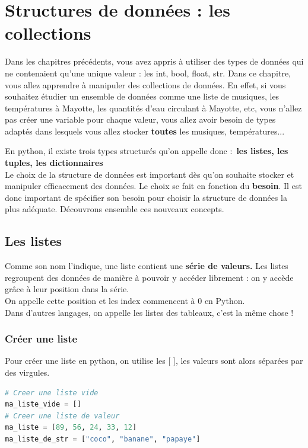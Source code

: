 \renewcommand{\chaptername}{\phantom{Chapitre}}\renewcommand{\thechapter}{}
\chapter{Structures de données : les collections}
\vspace{-1cm}
Dans les chapitres précédents, vous avez appris à utiliser des types de données qui ne contenaient qu'une unique valeur : les int, bool, float, str. 
Dans ce chapitre, vous allez apprendre à manipuler des collections de données. En effet, si vous souhaitez étudier un ensemble de données comme une liste de musiques, les températures à Mayotte, les quantités d'eau circulant à Mayotte, etc, vous n'allez pas créer une variable pour chaque valeur, vous allez avoir besoin de types adaptés dans lesquels vous allez stocker \textbf{toutes} les musiques, températures...\

En python, il existe trois types structurés qu'on appelle donc  :~\textbf{les listes, les tuples, les dictionnaires}\\

Le choix de la structure de données est important dès qu'on souhaite stocker et manipuler efficacement des données. Le choix se fait en fonction du \textbf{besoin}. Il est donc important de spécifier son besoin pour choisir la structure de données la plus adéquate. Découvrons ensemble ces nouveaux concepts.

\section{Les listes}

\begin{Definition}
Comme son nom l'indique, une liste contient une \textbf{série de valeurs.} Les listes regroupent des données de manière à pouvoir y accéder librement : on y accède grâce à leur position dans la série.\\
On appelle cette position  et les index commencent à {\Huge 0} en Python.\\
Dans d'autres langages, on appelle les listes des tableaux, c'est la même chose !
\end{Definition}


\subsection*{Créer une liste}
Pour créer une liste en python, on utilise les [ ], les valeurs sont alors séparées par des virgules.
\begin{lstlisting}[style=pythonstyle, language=python]
# Creer une liste vide 
ma_liste_vide = []
# Creer une liste de valeur
ma_liste = [89, 56, 24, 33, 12]
ma_liste_de_str = ["coco", "banane", "papaye"]
\end{lstlisting}

